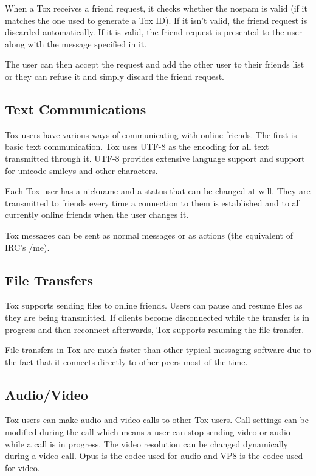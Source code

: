 \documentclass{tox}
\begin{document}
When a Tox receives a friend request, it checks whether the nospam is valid (if 
it matches the one used to generate a Tox ID). If it isn't valid, the friend 
request is discarded automatically. If it is valid, the friend request is presented to the 
user along with the message specified in it.

The user can then accept the request and add the other user to their friends list 
or they can refuse it and simply discard the friend request.

\subsection{Text Communications}

Tox users have various ways of communicating with online friends. The first is 
basic text communication. Tox uses UTF-8 as the encoding for all text 
transmitted through it. UTF-8 provides extensive language support and support for 
unicode smileys and other characters.

Each Tox user has a nickname and a status that can be changed at will. They are 
transmitted to friends every time a connection to them is established and to 
all currently online friends when the user changes it.

Tox messages can be sent as normal messages or as actions (the equivalent of 
IRC's /me).

\subsection{File Transfers}

Tox supports sending files to online friends. Users can pause and resume files 
as they are being transmitted. If clients become disconnected while the transfer is 
in progress and then reconnect afterwards, Tox supports resuming the file transfer.

File transfers in Tox are much faster than other typical messaging software due 
to the fact that it connects directly to other peers most of the time.

\subsection{Audio/Video}

Tox users can make audio and video calls to other Tox users. Call settings can 
be modified during the call which means a user can stop sending video or audio 
while a call is in progress. The video resolution can be changed dynamically 
during a video call. Opus is the codec used for audio and VP8 is the codec used 
for video.
\end{document}
